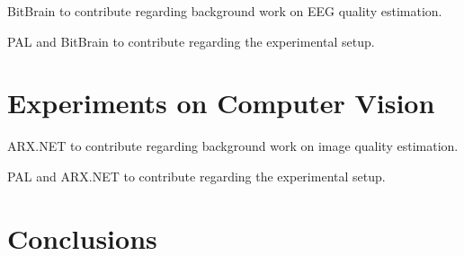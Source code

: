 %
{BitBrain to contribute regarding background work on EEG quality estimation.}

%
{PAL and BitBrain to contribute regarding the experimental setup.}

\section{Experiments on Computer Vision}

%
{ARX.NET to contribute regarding background work on image quality estimation.}

%
{PAL and ARX.NET to contribute regarding the experimental setup.}


\section{Conclusions}


